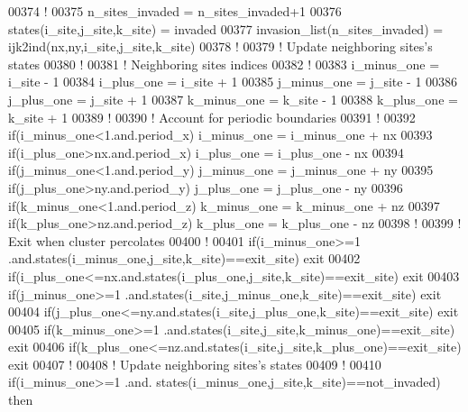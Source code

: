 \begin{DoxyCode}
00374        \textcolor{comment}{!}
00375        n\_sites\_invaded = n\_sites\_invaded+1
00376        states(i\_site,j\_site,k\_site) = invaded
00377        invasion\_list(n\_sites\_invaded) = ijk2ind(nx,ny,i\_site,j\_site,k\_site)
00378        \textcolor{comment}{!}
00379        \textcolor{comment}{! Update neighboring sites's states }
00380        \textcolor{comment}{!}
00381        \textcolor{comment}{! Neighboring sites indices }
00382        \textcolor{comment}{!}
00383        i\_minus\_one = i\_site - 1
00384        i\_plus\_one  = i\_site + 1
00385        j\_minus\_one = j\_site - 1
00386        j\_plus\_one  = j\_site + 1
00387        k\_minus\_one = k\_site - 1
00388        k\_plus\_one  = k\_site + 1
00389        \textcolor{comment}{!}
00390        \textcolor{comment}{! Account for periodic boundaries}
00391        \textcolor{comment}{!}
00392        \textcolor{keyword}{if}(i\_minus\_one<1.and.period\_x) i\_minus\_one = i\_minus\_one + nx
00393        \textcolor{keyword}{if}(i\_plus\_one>nx.and.period\_x) i\_plus\_one  = i\_plus\_one  - nx
00394        \textcolor{keyword}{if}(j\_minus\_one<1.and.period\_y) j\_minus\_one = j\_minus\_one + ny
00395        \textcolor{keyword}{if}(j\_plus\_one>ny.and.period\_y) j\_plus\_one  = j\_plus\_one  - ny
00396        \textcolor{keyword}{if}(k\_minus\_one<1.and.period\_z) k\_minus\_one = k\_minus\_one + nz
00397        \textcolor{keyword}{if}(k\_plus\_one>nz.and.period\_z) k\_plus\_one  = k\_plus\_one  - nz
00398        \textcolor{comment}{!}
00399        \textcolor{comment}{! Exit when cluster percolates}
00400        \textcolor{comment}{!}
00401        \textcolor{keyword}{if}(i\_minus\_one>=1 .and.states(i\_minus\_one,j\_site,k\_site)==exit\_site) 
      exit
00402        \textcolor{keyword}{if}(i\_plus\_one<=nx.and.states(i\_plus\_one,j\_site,k\_site)==exit\_site) exit
00403        \textcolor{keyword}{if}(j\_minus\_one>=1 .and.states(i\_site,j\_minus\_one,k\_site)==exit\_site) 
      exit
00404        \textcolor{keyword}{if}(j\_plus\_one<=ny.and.states(i\_site,j\_plus\_one,k\_site)==exit\_site) exit
00405        \textcolor{keyword}{if}(k\_minus\_one>=1 .and.states(i\_site,j\_site,k\_minus\_one)==exit\_site) 
      exit
00406        \textcolor{keyword}{if}(k\_plus\_one<=nz.and.states(i\_site,j\_site,k\_plus\_one)==exit\_site) exit
00407        \textcolor{comment}{!}
00408        \textcolor{comment}{! Update neighboring sites's states}
00409        \textcolor{comment}{!}
00410        \textcolor{keyword}{if}(i\_minus\_one>=1 .and. states(i\_minus\_one,j\_site,k\_site)==not\_invaded)\textcolor{keyword}{
      then}

\end{DoxyCode}
